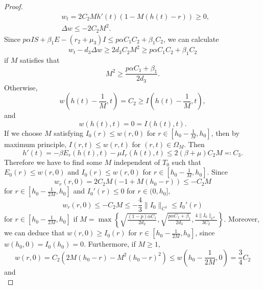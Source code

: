 \documentclass[11pt]{amsart}
\numberwithin{equation}{section}
\theoremstyle{plain}
\theoremstyle{definition}
\begin{document}
\begin{proof}
\begin{equation*}
\begin{aligned}
				&w_t=2C_2Mh'(t)(1-M(h(t)-r)) \geq 0,\\
				&\Delta w\leq -2C_2M^2.
			\end{aligned}
		\end{equation*}
		Since $p\alpha IS +\beta_1 E-(r_2+\mu_3)I\leq p \alpha C_1 C_2+\beta_1 C_2$, we can calculate
		\begin{equation*}
			w_t-d_3\Delta w \geq 2d_3C_2M^2 \geq p \alpha C_1 C_2 + \beta_1 C_2
		\end{equation*}
		if $M$ satisfies that
		\begin{equation*}
			M^2 \geq \frac{p \alpha C_1 +\beta _1}{2 d_3}.
		\end{equation*}
		Otherwise,
		\begin{equation*}
			w\left(h(t)-\frac{1}{M},t\right)=C_2 \geq I\left(h(t)-\frac{1}{M},t\right),
		\end{equation*}
		and
		\begin{equation*}
			w(h(t),t)=0=I(h(t),t).
		\end{equation*}
		If we choose $M$ satisfying $I_0(r) \leq w(r,0)$ for $r \in [h_0-\frac{1}{M},h_0]$, then by maximum principle, $I(r,t) \leq w(r,t)$ for $(r,t) \in \Omega_M$.
		Then
		\begin{equation*}
			h'(t)=-\beta E_r(h(t),t)-\mu I_r(h(t),t) \leq 2(\beta+\mu)C_2M \eqqcolon C_3.
		\end{equation*}
		Therefore we have to find some $M$ independent of $T_0$ such that $E_0(r) \leq w(r,0)$ and $I_0(r) \leq w(r,0)$ for $r\in [h_0-\frac{1}{M},h_0]$.
		Since
		\begin{equation*}
			w_r(r,0)=2C_2M(-1 +M(h_0-r)) \leq -C_2M
		\end{equation*}
		for $r \in [h_0-\frac{1}{2M}, h_0]$ and $I_0'(r) \leq 0$ for $r \in (0,h_0]$,
		\begin{equation*}
			w_r(r,0) \leq -C_2M \leq -\frac{4}{3} \lVert I_0 \rVert _{C^1} \leq {I_0}'(r)
		\end{equation*}
		for $r \in [h_0-\frac{1}{2M}, h_0]$ if $M=\max \left\{ 
		\sqrt{\frac{(1-p)\alpha C_1}{2d_2}}, \sqrt{\frac{p\alpha C_1+\beta_1}{2d_3}},\frac{4\lVert I_0 \rVert _{C^1}}{3C_2} \right\}$. Moreover, we can deduce that $w(r,0) \geq I_0(r)$ for $r \in [h_0-\frac{1}{2M},h_0]$, since $w(h_0,0)=I_0(h_0)=0$. Furthermore, if $M \geq 1$,
		\begin{equation*}
			w(r,0)=C_2(2M(h_0-r)-M^2(h_0-r)^2) \leq w\left(h_0-\frac{1}{2M},0\right)=\frac{3}{4} C_2
		\end{equation*}
		and
		\begin{equation*}

\end{equation*}
\end{proof}
\end{document}

